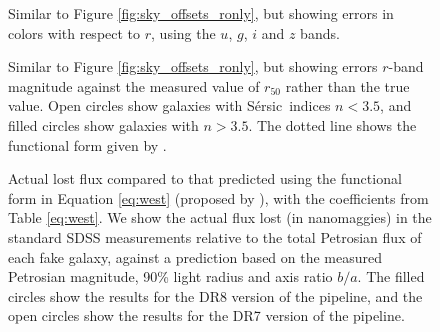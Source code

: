 \documentclass[10pt,preprint]{aastex}
\newcommand{\Sersic}{S\'ersic}
\newcounter{thefigs}
\newcommand{\fignum}{\arabic{thefigs}}
\newcounter{thetabs}
\begin{document}
\clearpage
{}
\begin{figure}
\figurenum{\fignum}
\caption{\label{fig:sky_offsets_ugiz} Similar to Figure
  \ref{fig:sky_offsets_ronly}, but showing errors in colors with respect to
  $r$, using the $u$, $g$, $i$ and $z$ bands.}
\end{figure}

\clearpage
{}
\begin{figure}
\figurenum{\fignum}
\caption{\label{fig:sky_offsets_vs_r50meas} Similar to Figure
  \ref{fig:sky_offsets_ronly}, but showing errors $r$-band magnitude against
  the measured value of $r_{50}$ rather than the true value. Open
  circles show galaxies with \Sersic\ indices $n< 3.5$, and filled
  circles show galaxies with $n>3.5$. The
  dotted line shows the functional form given by \citet{hyde09a}.}
\end{figure}

\clearpage
{}
\begin{figure}
\figurenum{\fignum}
\caption{\label{fig:sky_offsets_vs_west} Actual lost flux compared to
  that predicted using the functional form in Equation \ref{eq:west}
  (proposed by \citealt{west10a}), with the coefficients from Table
  \ref{eq:west}.  We show the actual flux lost (in nanomaggies) in the
  standard SDSS measurements relative to the total Petrosian flux of
  each fake galaxy, against a prediction based on the measured
  Petrosian magnitude, 90\% light radius and axis ratio $b/a$. The
  filled circles show the results for the DR8 version of the pipeline,
  and the open circles show the results for the DR7 version of the
  pipeline.}
\end{figure}


\newpage
\clearpage
\clearpage

\setcounter{thetabs}{0}

\clearpage
\end{document}
